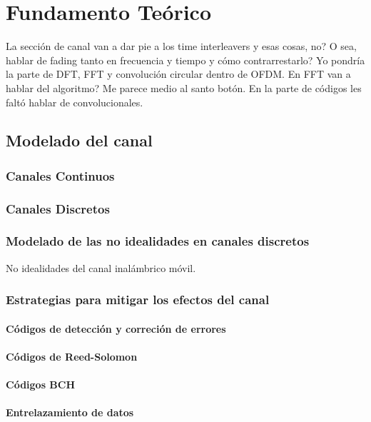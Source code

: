 \chapter{Fundamento Teórico}

La sección de canal van a dar pie a los time interleavers y esas cosas, no? O sea, hablar de fading tanto en frecuencia y tiempo y cómo contrarrestarlo?
Yo pondría la parte de DFT, FFT y convolución circular dentro de OFDM. En FFT van a hablar del algoritmo? Me parece medio al santo botón.
En la parte de códigos les faltó hablar de convolucionales.


\section{Modelado del canal}
\subsection{Canales Continuos}
\subsection{Canales Discretos}
\subsection{Modelado de las no idealidades en canales discretos}
No idealidades del canal inalámbrico móvil.
\subsection{Estrategias para mitigar los efectos del canal}

\subsubsection{C\'odigos de detecci\'on y correci\'on de errores}

\subsubsection{C\'odigos de Reed-Solomon}

\subsubsection{C\'odigos BCH}

\subsubsection{Entrelazamiento de datos}



